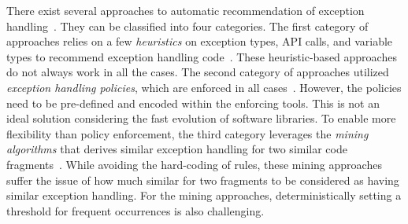 There exist several approaches to automatic recommendation of 
exception
handling~\cite{barbosa-bsse12,chanchal-scam14,barbosa-tse18,barbosa-tse16,xrank-fse20,throw-ase22}. They
can be classified into four categories. The first category of
approaches relies on a few {\em heuristics} on exception types, API
calls, and variable types to recommend exception handling
code~\cite{barbosa-bsse12}. These heuristic-based approaches do not
always work in all the cases. The second category of approaches
utilized {\em exception handling policies}, which are enforced in all
cases~\cite{barbosa-tse16,barbosa-saner18}. However, the policies need
to be pre-defined and encoded within the enforcing tools.  This is not
an ideal solution considering the fast evolution of software
libraries. To enable more flexibility than policy enforcement, the
third category leverages the {\em mining algorithms} that derives
similar exception handling for two similar code
fragments~\cite{chanchal-scam14}. While avoiding the hard-coding of
rules, these mining approaches suffer the issue of how much similar
for two fragments to be considered as having similar exception
handling. For the mining approaches, deterministically setting a
threshold for frequent occurrences is also challenging.

